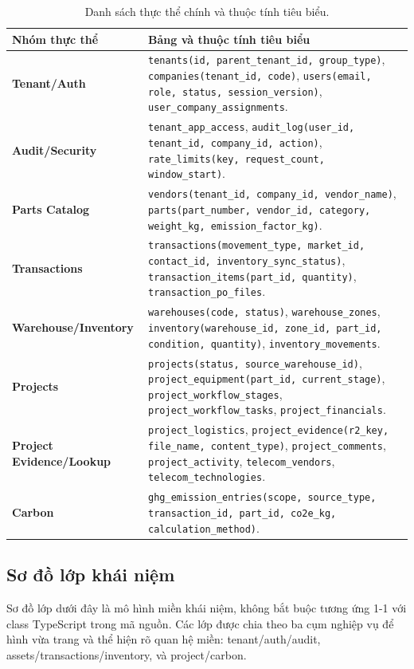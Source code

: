 \begin{table}[H]
\centering
\caption{Danh sách thực thể chính và thuộc tính tiêu biểu.}
\label{tab:entities}
\begin{tabularx}{\textwidth}{|>{\bfseries\small}p{3.7cm}|>{\small}X|}
\hline
\textbf{Nhóm thực thể} & \textbf{Bảng và thuộc tính tiêu biểu} \\
\hline
Tenant/Auth & \texttt{tenants(id, parent\_tenant\_id, group\_type)}, \texttt{companies(tenant\_id, code)}, \texttt{users(email, role, status, session\_version)}, \texttt{user\_company\_assignments}. \\
\hline
Audit/Security & \texttt{tenant\_app\_access}, \texttt{audit\_log(user\_id, tenant\_id, company\_id, action)}, \texttt{rate\_limits(key, request\_count, window\_start)}. \\
\hline
Parts Catalog & \texttt{vendors(tenant\_id, company\_id, vendor\_name)}, \texttt{parts(part\_number, vendor\_id, category, weight\_kg, emission\_factor\_kg)}. \\
\hline
Transactions & \texttt{transactions(movement\_type, market\_id, contact\_id, inventory\_sync\_status)}, \texttt{transaction\_items(part\_id, quantity)}, \texttt{transaction\_po\_files}. \\
\hline
Warehouse/Inventory & \texttt{warehouses(code, status)}, \texttt{warehouse\_zones}, \texttt{inventory(warehouse\_id, zone\_id, part\_id, condition, quantity)}, \texttt{inventory\_movements}. \\
\hline
Projects & \texttt{projects(status, source\_warehouse\_id)}, \texttt{project\_equipment(part\_id, current\_stage)}, \texttt{project\_workflow\_stages}, \texttt{project\_workflow\_tasks}, \texttt{project\_financials}. \\
\hline
Project Evidence/Lookup & \texttt{project\_logistics}, \texttt{project\_evidence(r2\_key, file\_name, content\_type)}, \texttt{project\_comments}, \texttt{project\_activity}, \texttt{telecom\_vendors}, \texttt{telecom\_technologies}. \\
\hline
Carbon & \texttt{ghg\_emission\_entries(scope, source\_type, transaction\_id, part\_id, co2e\_kg, calculation\_method)}. \\
\hline
\end{tabularx}
\end{table}

\subsection{Sơ đồ lớp khái niệm}
Sơ đồ lớp dưới đây là mô hình miền khái niệm, không bắt buộc tương ứng 1-1 với class TypeScript trong mã nguồn. Các lớp được chia theo ba cụm nghiệp vụ để hình vừa trang và thể hiện rõ quan hệ miền: tenant/auth/audit, assets/transactions/inventory, và project/carbon.

